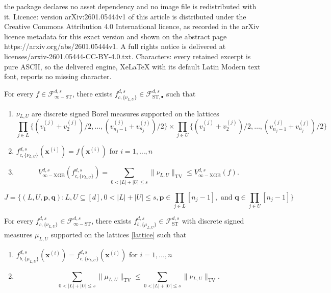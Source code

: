 \documentclass[10pt,a4paper]{amsart}
\newcommand{\fcnu}{{f^{d, s}_{c, \{\nu_{L, U}\}}}}
\newcommand{\fstinf}{{\mathcal{F}^{d, s}_{\infty-\text{ST}}}}
\newcommand{\fstmid}{{\mathcal{F}^{d, s}_{\text{ST}, \bullet}}}
\newcommand{\fst}{{\mathcal{F}^{d, s}_{\text{ST}}}}
\newcommand{\pbf}{{\mathbf{p}}}
\newcommand{\qbf}{{\mathbf{q}}}
\newcommand{\vinfxgb}{{V^{d, s}_{\infty-\text{XGB}}}}
\newcommand{\xbf}{{\mathbf{x}}}
\begin{document}
the package declares no asset dependency and no image file is redistributed with it. Licence: version arXiv:2601.05444v1 of this article is distributed under the Creative Commons Attribution 4.0 International licence, as recorded in the arXiv licence metadata for this exact version and shown on the abstract page https://arxiv.org/abs/2601.05444v1. A full rights notice is delivered at licenses/arxiv-2601.05444-CC-BY-4.0.txt. Characters: every retained excerpt is pure ASCII, so the delivered engine, XeLaTeX with its default Latin Modern text font, reports no missing character.
\begin{lemma}\label{lem:discretization}
    For every $f \in \fstinf$, there exists 
    $\fcnu \in \fstmid$ such that
    \begin{enumerate}[label = (\alph*)]
    \item $\nu_{L, U}$ are discrete signed Borel measures supported 
    on the lattices
    \begin{equation}\label{lattice}
        \prod_{j \in L} \Big\{ (v^{(j)}_1 + v^{(j)}_2)/2, \dots, 
        (v^{(j)}_{n_j - 1} + v^{(j)}_{n_j})/2 \Big\} \times 
        \prod_{j \in U} \Big\{ (v^{(j)}_1 + v^{(j)}_2)/2, \dots, 
        (v^{(j)}_{n_j - 1} + v^{(j)}_{n_j})/2 \Big\}
    \end{equation}
    \item $\fcnu(\xbf^{(i)}) = f(\xbf^{(i)})$ for 
    $i = 1, \dots, n$
    \item 
    \begin{equation*}
        \vinfxgb(\fcnu) 
        = \sum_{0 < |L| + |U| \le s} \|\nu_{L, U}\|_{\text{TV}}
        \le \vinfxgb(f).
    \end{equation*}
    \end{enumerate}
\end{lemma}

\begin{equation}\label{eq:index-set}
    J = \bigg\{ (L, U, \pbf, \qbf):  
    L, U \subseteq [d], 0 < |L| + |U| \le s,
    \pbf \in \prod_{j \in L} [n_j - 1], \text{ and } 
    \qbf \in \prod_{j \in U} [n_j - 1] \bigg\}
\end{equation}

\begin{lemma}\label{lem:reduction-to-discrete-measures}
    For every $\fcnu \in \fstinf$, there exists 
    $f^{d, s}_{b, \{\mu_{L, U}\}} \in \fst$ with discrete signed 
    measures $\mu_{L, U}$ supported on the lattices \eqref{lattice} 
    such that 
    \begin{enumerate}[label = (\alph*)]
    \item $f^{d, s}_{b, \{\mu_{L, U}\}}(\xbf^{(i)})
    = \fcnu(\xbf^{(i)})$ for $i = 1, \dots, n$
    \item 
    \begin{equation*}
        \sum_{0 < |L| + |U| \le s} \|\mu_{L, U}\|_{\text{TV}} 
        \le \sum_{0 < |L| + |U| \le s} \|\nu_{L, U}\|_{\text{TV}}.
    \end{equation*}
    \end{enumerate}
\end{lemma}
\end{document}
